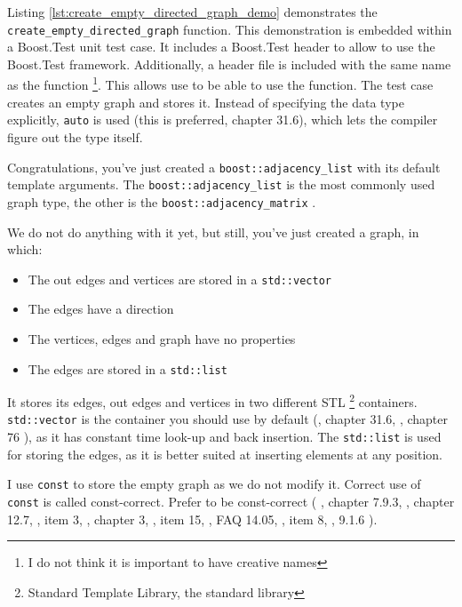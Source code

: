 Listing \ref{lst:create_empty_directed_graph_demo}
demonstrates the \verb;create_empty_directed_graph; function.
This demonstration is embedded within a Boost.Test unit test case.
It includes a Boost.Test header to allow to use the Boost.Test framework.
Additionally, a header file is included with the same name as the function
\footnote{
  I do not think it is important to have creative names
}.
This allows use to be able to use the function.
The test case creates an empty graph and stores it.
Instead of specifying the data type explicitly, 
\verb;auto;  is used (this is preferred, \cite{stroustrup2013}
chapter 31.6), which lets the compiler figure out the type itself.



Congratulations, you've just created a 
\verb;boost::adjacency_list; 
with its default template arguments.
The \verb;boost::adjacency_list; is the most commonly used graph type, the other
is the \verb;boost::adjacency_matrix; .

We do not do anything with it yet, but still, you've just created a graph,
in which:

\begin{itemize}
  \item The out edges and vertices are stored in a 
    \verb;std::vector; 
  \item The edges have a direction
  \item The vertices, edges and graph have no properties
  \item The edges are stored in a \verb;std::list; 
\end{itemize}

It stores its edges, out edges and vertices in two different STL 
\footnote{
  Standard Template Library, the standard library
}
containers.
\verb;std::vector;  
is the container you should use by 
default (\cite{stroustrup2013}, chapter 31.6, 
  \cite{sutter_and_alexandrescu2004}, chapter 76
), as it has constant time look-up and back insertion.
The \verb;std::list; 
is used for storing the edges, as it is better suited at inserting elements
at any position.

I use \verb;const;  to store the empty graph as we do not modify it.
Correct use of \verb;const; is called const-correct.
Prefer to be const-correct 
(
  \cite{stroustrup1997}, chapter 7.9.3, 
  \cite{stroustrup2013}, chapter 12.7, 
  \cite{meyers2005effective}, item 3, 
  \cite{hollingworth2000cpp_builder_dev_guide}, chapter 3, 
  \cite{sutter_and_alexandrescu2004}, item 15, 
  \cite{cline1998cpp_faqs}, FAQ 14.05, 
  \cite{eckel2002thinking_cpp}, item 8, 
  \cite{lakos1996large}, 9.1.6
).

